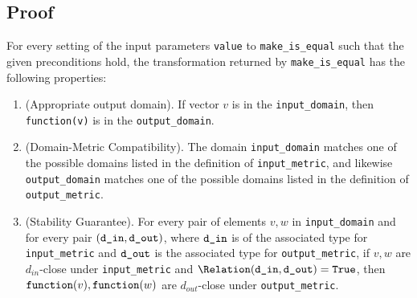\subsection{Proof}
\begin{theorem}


For every setting of the input parameters \texttt{value} to \texttt{make\_is\_equal} such that the given preconditions hold, the transformation returned by \texttt{make\_is\_equal} has the following properties:
\begin{enumerate}
    \item \textup{(Appropriate output domain).} If vector $v$ is in the \texttt{input\_domain}, then \texttt{function(v)} is in the \texttt{output\_domain}.
    \item \textup{(Domain-Metric Compatibility).} The domain \texttt{input\_domain} matches one of the possible domains listed in the definition of \texttt{input\_metric}, and likewise \texttt{output\_domain} matches one of the possible domains listed in the definition of \texttt{output\_metric}.
    \item \textup{(Stability Guarantee).} For every pair of elements $v, w$ in \texttt{input\_domain} and for every pair $(\texttt{d\_in}, \texttt{d\_out})$, where $\texttt{d\_in}$ is of the associated type for \texttt{input\_metric} and $\texttt{d\_out}$ is the associated type for \texttt{output\_metric}, if $v,w$ are $d_{in}$-close under \texttt{input\_metric} and $\Relation(\din, \dout) = \True$, then $\texttt{function}(v), \texttt{function}(w)$ are $d_{out}$-close under \texttt{output\_metric}.
\end{enumerate}
\end{theorem}
